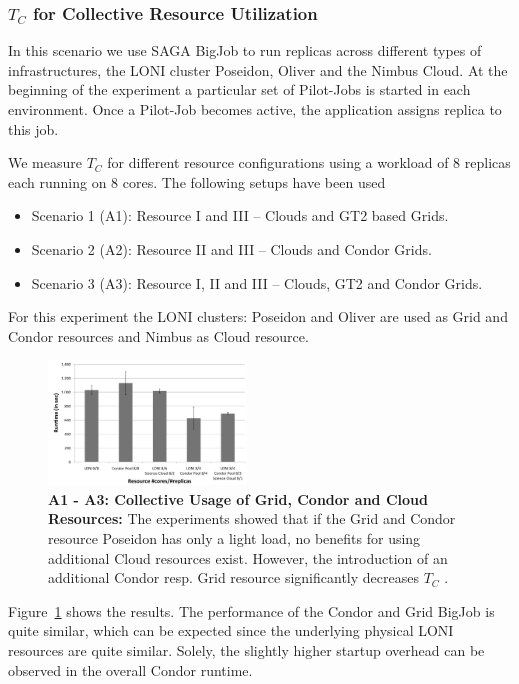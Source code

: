 \documentclass[conference,final]{IEEEtran}
\newcommand{\tc}{$T_{C}$ }
\begin{document}
\subsubsection{\tc for Collective Resource Utilization}

In this scenario we use SAGA BigJob to run replicas across
different types of infrastructures, the LONI
cluster Poseidon, Oliver and the Nimbus Cloud. 
At the beginning of the experiment a particular set of
Pilot-Jobs is started in each environment. Once a Pilot-Job becomes
active, the application assigns replica to this job. 

We measure \tc for different resource configurations using a workload
of 8 replicas each running on 8 cores. The following setups have been used
\begin{itemize}
\item Scenario 1 (A1): Resource I and III -- Clouds and GT2 based Grids. 
\item Scenario 2 (A2): Resource II and III -- Clouds and Condor Grids.
\item Scenario 3 (A3): Resource I, II and III -- Clouds, GT2 and Condor Grids.
\end{itemize} 
For this experiment the LONI clusters: Poseidon and Oliver are used as Grid and Condor resources and
Nimbus as Cloud resource.

\begin{figure}[htbp]
    \centering
        \includegraphics[width=0.47\textwidth]{performance/8replica_scenario_grid_condor_cloud}
        \caption{\textbf{A1 - A3: Collective Usage of Grid, Condor and
            Cloud Resources: } The experiments showed that if the Grid
          and Condor resource Poseidon has only a light load, no
          benefits for using additional Cloud resources
          exist. However, the introduction of an additional Condor
          resp. Grid resource significantly decreases \tc.}
    \label{fig:performance_8replica_grid_cloud_condor}
\end{figure}

Figure~\ref{fig:performance_8replica_grid_cloud_condor} shows the results. 
The performance of the Condor and Grid BigJob is quite similar, which can be expected since the underlying 
physical LONI resources are quite similar. Solely, the slightly higher startup overhead can be observed in the overall Condor
runtime.
\end{document}
